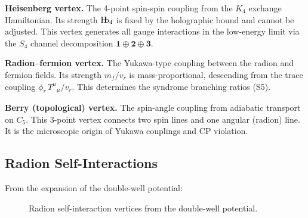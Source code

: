 \documentclass[11pt,a4paper]{article}
\theoremstyle{definition}
\theoremstyle{remark}
\newcommand{\Hb}{\textnormal{H\kern-0.3em b}}
\newcommand{\Hbfour}{\Hb_4}
\begin{document}
\noindent\textbf{Heisenberg vertex.}
The 4-point spin-spin coupling from the $K_4$ exchange Hamiltonian. Its strength $\Hbfour$ is fixed by the holographic bound and cannot be adjusted. This vertex generates all gauge interactions in the low-energy limit via the $S_4$ channel decomposition $\mathbf{1}\oplus\mathbf{2}\oplus\mathbf{3}$.

\noindent\textbf{Radion--fermion vertex.}
The Yukawa-type coupling between the radion and fermion fields. Its strength $m_f/v_r$ is mass-proportional, descending from the trace coupling $\phi_r \,T^\mu{}_\mu / v_r$. This determines the syndrome branching ratios (S5).

\noindent\textbf{Berry (topological) vertex.}
The spin-angle coupling from adiabatic transport on $C_5$. This 3-point vertex connects two spin lines and one angular (radion) line. It is the microscopic origin of Yukawa couplings and CP violation.

\subsection{Radion Self-Interactions}

From the expansion of the double-well potential:

\begin{figure}[H]
\centering
{}
\caption{Radion self-interaction vertices from the double-well potential.}
\label{fig:self_interactions}
\end{figure}
\end{document}
